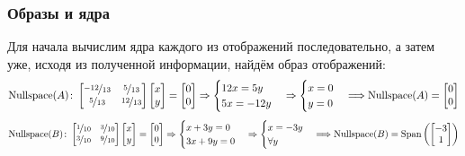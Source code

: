\documentclass[a3paper,14pt]{extarticle}
\begin{document}
\subsubsection*{\centering Образы и ядра}
Для начала вычислим ядра каждого из отображений последовательно, а затем уже, исходя из полученной информации, найдём образ отображений:
$$\text{Nullspace}(A)\colon \begin{bmatrix}
    \nicefrac{-12}{13} & \nicefrac{5}{13} \\ \nicefrac{5}{13} & \nicefrac{12}{13}
\end{bmatrix}\begin{bmatrix}
    x \\ y
\end{bmatrix} = \begin{bmatrix}
    0 \\ 0
\end{bmatrix} \Rightarrow \begin{cases}
    12x = 5y \\ 5x = -12y
\end{cases} \Rightarrow \begin{cases}
    x = 0 \\ y = 0
\end{cases}\Longrightarrow \text{Nullspace}(A)=\begin{bmatrix}
    0 \\ 0
\end{bmatrix}$$
$$\text{Nullspace}(B)\colon \begin{bmatrix}
    \nicefrac{1}{10} & \nicefrac{3}{10} \\ \nicefrac{3}{10} & \nicefrac{9}{10}
\end{bmatrix}\begin{bmatrix}
    x \\ y
\end{bmatrix} = \begin{bmatrix}
    0 \\ 0
\end{bmatrix} \Rightarrow \begin{cases}
    x + 3y = 0 \\ 3x + 9y = 0
\end{cases} \Rightarrow \begin{cases}
    x = -3y \\ \forall y
\end{cases}\Longrightarrow \text{Nullspace}(B)=\text{Span}\left(\begin{bmatrix}
    -3 \\ 1
\end{bmatrix}\right)$$
\end{document}
